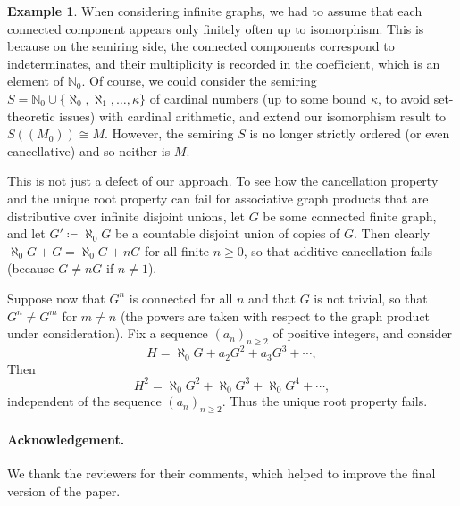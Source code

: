 \documentclass{amsart}
\theoremstyle{plain}
\theoremstyle{definition}
\newtheorem{example}[thm]{Example}
\newcommand{\bN}{\mathbb N}
\newcommand{\hmnser}[2]{{#1}(\!({#2})\!)}
\begin{document}
\begin{example} \label{exm:infinite-bad}
  When considering infinite graphs, we had to assume that each connected component appears only finitely often up to isomorphism.
This is because on the semiring side, the connected components correspond to indeterminates, and their multiplicity is recorded in the coefficient, which is an element of $\bN_0$.
Of course, we could consider the semiring $S=\bN_0 \cup \{\aleph_0, \aleph_1, \dots, \kappa\}$ of cardinal numbers (up to some bound $\kappa$, to avoid set-theoretic issues) with cardinal arithmetic, and extend our isomorphism result to $\hmnser{S}{M_0} \cong M$.
However, the semiring $S$ is no longer strictly ordered (or even cancellative) and so neither is $M$.

This is not just a defect of our approach.
To see how the cancellation property and the unique root property can fail for associative graph products that are distributive over infinite disjoint unions, let $G$ be some connected finite graph, and let $G'\coloneqq \aleph_0 G$ be a countable disjoint union of copies of $G$.
Then clearly $\aleph_0 G + G = \aleph_0 G + n G$ for all finite $n \ge 0$, so that additive cancellation fails (because $G \ne nG$ if $n \ne 1$).

Suppose now that $G^n$ is connected for all $n$ and that $G$ is not trivial, so that $G^n \ne G^m$ for $m \ne n$ (the powers are taken with respect to the graph product under consideration).
Fix a sequence $(a_n)_{n \ge 2}$ of positive integers, and consider
\[
H = \aleph_0 G + a_2 G^2 + a_3 G^3 + \cdots,
\]
Then
\[
H^2 = \aleph_0 G^2 + \aleph_0 G^3 + \aleph_0 G^4 + \cdots,
\]
independent of the sequence $(a_n)_{n \ge 2}$.
Thus the unique root property fails.
\end{example}

\paragraph{Acknowledgement.} We thank the reviewers for their comments, which helped to improve the final version of the paper.




\end{document}
